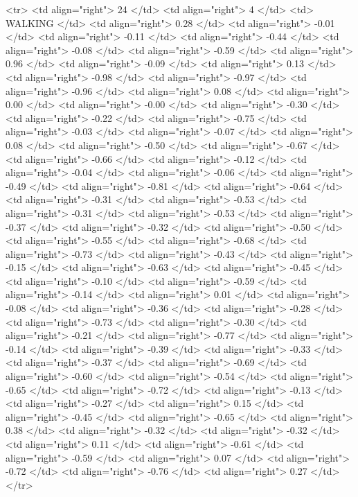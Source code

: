   <tr> <td align="right"> 24 </td> <td align="right">   4 </td> <td> WALKING </td> <td align="right"> 0.28 </td> <td align="right"> -0.01 </td> <td align="right"> -0.11 </td> <td align="right"> -0.44 </td> <td align="right"> -0.08 </td> <td align="right"> -0.59 </td> <td align="right"> 0.96 </td> <td align="right"> -0.09 </td> <td align="right"> 0.13 </td> <td align="right"> -0.98 </td> <td align="right"> -0.97 </td> <td align="right"> -0.96 </td> <td align="right"> 0.08 </td> <td align="right"> 0.00 </td> <td align="right"> -0.00 </td> <td align="right"> -0.30 </td> <td align="right"> -0.22 </td> <td align="right"> -0.75 </td> <td align="right"> -0.03 </td> <td align="right"> -0.07 </td> <td align="right"> 0.08 </td> <td align="right"> -0.50 </td> <td align="right"> -0.67 </td> <td align="right"> -0.66 </td> <td align="right"> -0.12 </td> <td align="right"> -0.04 </td> <td align="right"> -0.06 </td> <td align="right"> -0.49 </td> <td align="right"> -0.81 </td> <td align="right"> -0.64 </td> <td align="right"> -0.31 </td> <td align="right"> -0.53 </td> <td align="right"> -0.31 </td> <td align="right"> -0.53 </td> <td align="right"> -0.37 </td> <td align="right"> -0.32 </td> <td align="right"> -0.50 </td> <td align="right"> -0.55 </td> <td align="right"> -0.68 </td> <td align="right"> -0.73 </td> <td align="right"> -0.43 </td> <td align="right"> -0.15 </td> <td align="right"> -0.63 </td> <td align="right"> -0.45 </td> <td align="right"> -0.10 </td> <td align="right"> -0.59 </td> <td align="right"> -0.14 </td> <td align="right"> 0.01 </td> <td align="right"> -0.08 </td> <td align="right"> -0.36 </td> <td align="right"> -0.28 </td> <td align="right"> -0.73 </td> <td align="right"> -0.30 </td> <td align="right"> -0.21 </td> <td align="right"> -0.77 </td> <td align="right"> -0.14 </td> <td align="right"> -0.39 </td> <td align="right"> -0.33 </td> <td align="right"> -0.37 </td> <td align="right"> -0.69 </td> <td align="right"> -0.60 </td> <td align="right"> -0.54 </td> <td align="right"> -0.65 </td> <td align="right"> -0.72 </td> <td align="right"> -0.13 </td> <td align="right"> -0.27 </td> <td align="right"> 0.15 </td> <td align="right"> -0.45 </td> <td align="right"> -0.65 </td> <td align="right"> 0.38 </td> <td align="right"> -0.32 </td> <td align="right"> -0.32 </td> <td align="right"> 0.11 </td> <td align="right"> -0.61 </td> <td align="right"> -0.59 </td> <td align="right"> 0.07 </td> <td align="right"> -0.72 </td> <td align="right"> -0.76 </td> <td align="right"> 0.27 </td> </tr>
